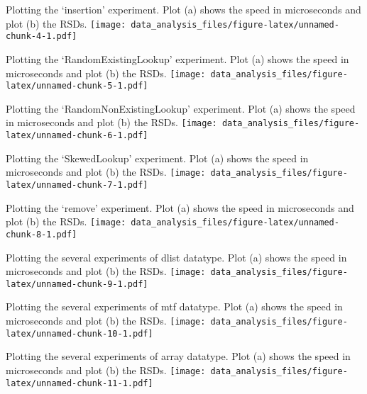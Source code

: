 \documentclass[]{article}
\begin{document}
Plotting the `insertion' experiment. Plot (a) shows the speed in
microseconds and plot (b) the RSDs.
\texttt{[image: data\_analysis\_files/figure-latex/unnamed-chunk-4-1.pdf]}

Plotting the `RandomExistingLookup' experiment. Plot (a) shows the speed
in microseconds and plot (b) the RSDs.
\texttt{[image: data\_analysis\_files/figure-latex/unnamed-chunk-5-1.pdf]}

Plotting the `RandomNonExistingLookup' experiment. Plot (a) shows the
speed in microseconds and plot (b) the RSDs.
\texttt{[image: data\_analysis\_files/figure-latex/unnamed-chunk-6-1.pdf]}

Plotting the `SkewedLookup' experiment. Plot (a) shows the speed in
microseconds and plot (b) the RSDs.
\texttt{[image: data\_analysis\_files/figure-latex/unnamed-chunk-7-1.pdf]}

Plotting the `remove' experiment. Plot (a) shows the speed in
microseconds and plot (b) the RSDs.
\texttt{[image: data\_analysis\_files/figure-latex/unnamed-chunk-8-1.pdf]}

Plotting the several experiments of dlist datatype. Plot (a) shows the
speed in microseconds and plot (b) the RSDs.
\texttt{[image: data\_analysis\_files/figure-latex/unnamed-chunk-9-1.pdf]}

Plotting the several experiments of mtf datatype. Plot (a) shows the
speed in microseconds and plot (b) the RSDs.
\texttt{[image: data\_analysis\_files/figure-latex/unnamed-chunk-10-1.pdf]}

Plotting the several experiments of array datatype. Plot (a) shows the
speed in microseconds and plot (b) the RSDs.
\texttt{[image: data\_analysis\_files/figure-latex/unnamed-chunk-11-1.pdf]}
\end{document}
